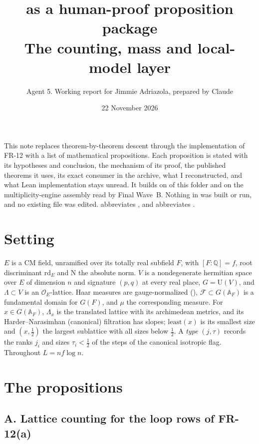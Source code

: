 \documentclass[11pt]{article}
\title{\PC{5} as a human-proof proposition package\\ \large The \FR{12} counting, mass and local-model layer}
\author{Agent 5. Working report for Jimmie Adriazola, prepared by Claude}
\date{22 November 2026}
\newcommand{\FR}[1]{\textsf{FR-#1}}
\newcommand{\Ok}{\mathcal O}
\newcommand{\rd}{\mathrm{rd}}
\newcommand{\N}{\mathrm N}
\theoremstyle{remark}
\begin{document}
\maketitle

\noindent This note replaces theorem-by-theorem descent through the implementation of \FR{12} with a list of mathematical propositions. Each proposition is stated with its hypotheses and conclusion, the mechanism of its proof, the published theorems it uses, its exact consumer in the archive, what I reconstructed, and what Lean implementation stays unread. It builds on  of this folder and on the multiplicity-engine assembly read by Final Wave~B. Nothing in  was built or run, and no existing file was edited.  abbreviates , and  abbreviates .

\section{Setting}

$E$ is a CM field, unramified over its totally real subfield $F$, with $[F:\mathbb Q]=f$, root discriminant $\rd_E$ and $\N$ the absolute norm. $V$ is a nondegenerate hermitian space over $E$ of dimension $n$ and signature $(p,q)$ at every real place, $G=\mathrm U(V)$, and $\Lambda\subset V$ is an $\Ok_E$-lattice. Haar measures are gauge-normalized (), $\mathcal F\subset G(\mathbb A_F)$ is a fundamental domain for $G(F)$, and $\mu$ the corresponding measure. For $x\in G(\mathbb A_F)$, $\Lambda_x$ is the translated lattice with its archimedean metrics, and its Harder--Narasimhan (canonical) filtration has slopes; $\mathrm{least}(x)$ is its smallest size and $(x,\tfrac12)$ the largest sublattice with all sizes below $\tfrac12$. A \emph{type} $(j,\tau)$ records the ranks $j_i$ and sizes $\tau_i<\tfrac12$ of the steps of the canonical isotropic flag. Throughout $L=nf\log n$.

\section{The propositions}

\subsection*{A. Lattice counting for the loop rows of \FR{12}(a)}
\end{document}
